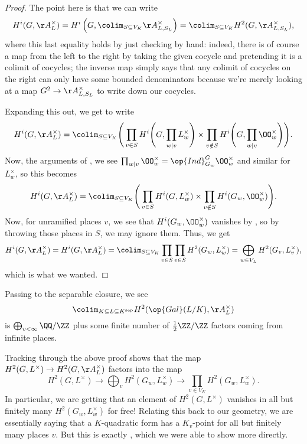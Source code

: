 \documentclass[../notes.tex]{subfiles}
\begin{document}
\begin{proof}
	The point here is that we can write
	\[H^i(G,\AA_L^\times)=H^i\left(G,\colim_{S\subseteq V_K}\AA_{L,S_L}^\times\right)=\colim_{S\subseteq V_K}H^2(G,\AA_{L,S_L}^\times),\]
	where this last equality holds by just checking by hand: indeed, there is of course a map from the left to the right by taking the given cocycle and pretending it is a colimit of cocycles; the inverse map simply says that any colimit of cocycles on the right can only have some bounded denominators because we're merely looking at a map $G^2\to\AA_{L,S_L}^\times$ to write down our cocycles.

	Expanding this out, we get to write
	\[H^i(G,\AA_L^\times)=\colim_{S\subseteq V_K}\Bigg(\prod_{v\in S}H^i\Bigg(G,\prod_{w\mid v}L_w^\times\Bigg)\times\prod_{v\notin S}H^i\Bigg(G,\prod_{w\mid v}\OO_w^\times\Bigg)\Bigg).\]
	Now, the arguments of , we see $\prod_{w\mid v}\OO_w^\times=\op{Ind}_{G_w}^G\OO_w^\times$ and similar for $L_w^\times$, so this becomes
	\[H^i(G,\AA_L^\times)=\colim_{S\subseteq V_K}\Bigg(\prod_{v\in S}H^i(G,L_w^\times)\times\prod_{v\notin S}H^i(G_w,\OO_w^\times)\Bigg).\]
	Now, for unramified places $v$, we see that $H^i(G_w,\OO_w^\times)$ vanishes by , so by throwing those places in $S$, we may ignore them. Thus, we get
	\[H^i(G,\AA_L^\times)=H^i(G,\AA_L^\times)=\colim_{S\subseteq V_K}\prod_{v\in S}\prod_{v\in S}H^2(G_w,L_w^\times)=\bigoplus_{w\in V_L}H^2(G_v,L_v^\times),\]
	which is what we wanted.
\end{proof}
\begin{remark}
	Passing to the separable closure, we see
	\[\colim_{K\subseteq L\subseteq K^{\mathrm{sep}}}H^2(\op{Gal}(L/K),\AA_L^\times)\]
	is $\bigoplus_{v<\infty}\QQ/\ZZ$ plus some finite number of $\frac12\ZZ/\ZZ$ factors coming from infinite places.
\end{remark}
\begin{remark}
	Tracking through the above proof shows that the map $H^2(G,L^\times)\to H^2(G,\AA_L^\times)$ factors into the map
	\[H^2(G,L^\times)\to\bigoplus_vH^2(G_w,L_w^\times)\to\prod_{v\in V_K}H^2(G_w,L_w^\times).\]
	In particular, we are getting that an element of $H^2(G,L^\times)$ vanishes in all but finitely many $H^2(G_w,L_w^\times)$ for free! Relating this back to our geometry, we are essentially saying that a $K$-quadratic form has a $K_v$-point for all but finitely many places $v$. But this is exactly , which we were able to show more directly.
\end{remark}
\end{document}
